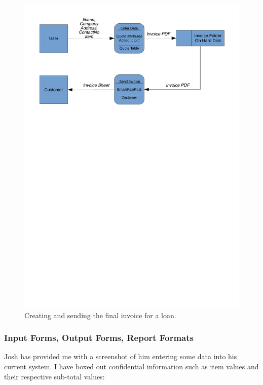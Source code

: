 \begin{center}
    \begin{figure}[H]
        \centerline{\includegraphics[width=\textwidth]{./Analysis/Dataflow/Old_System/Old_Sys_Data_flow_invoice.pdf}}
        \caption{Creating and sending the final invoice for a loan.} \label{fig:print_function_result}
    \end{figure}
\end{center}

\newpage

\subsubsection{Input Forms, Output Forms, Report Formats}

Josh has provided me with a screenshot of him entering some data into his current system. I have boxed out confidential information such as item values and their respective sub-total values:\\

